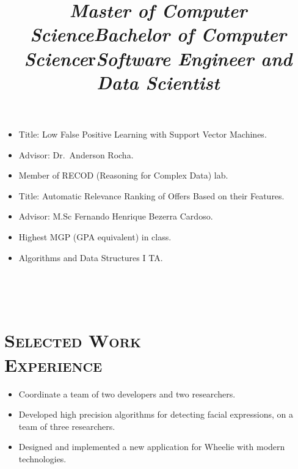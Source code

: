 \begin{resume}
\title{\emph{Master of Computer Science}}
\begin{position}
\vspace{1mm}
\begin{itemize}\small
\item Title: Low False Positive Learning with Support Vector Machines.
\item Advisor: Dr.\ Anderson Rocha.
\item Member of RECOD (Reasoning for Complex Data) lab.
\end{itemize}
\end{position}

\title{\emph{Bachelor of Computer Science}}
\begin{position}
\begin{itemize}\small
\vspace{1mm}
\item Title: Automatic Relevance Ranking of Offers Based on their Features.
\item Advisor: M.Sc Fernando Henrique Bezerra Cardoso.
\item Highest MGP (GPA equivalent) in class.
\item Algorithms and Data Structures I TA\@.
\end{itemize}
\end{position}


\begin{formatb}
  \\
  \title{r}\\
\end{formatb}

\section{\textsc{Selected Work\\Experience}}

\title{\emph{Software Engineer and Data Scientist}}
\begin{position}
\vspace{1mm}
\begin{itemize}\small
\item Coordinate a team of two developers and two researchers.
\item Developed high precision algorithms for detecting facial expressions, on a team of three researchers.
\item Designed and implemented a new application for Wheelie with modern technologies.


\end{itemize}
\end{position}
\end{resume}
